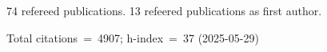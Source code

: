 74 refereed publications. 13 refeered publications as first author.

Total citations~=~4907; h-index~=~37 (2025-05-29)